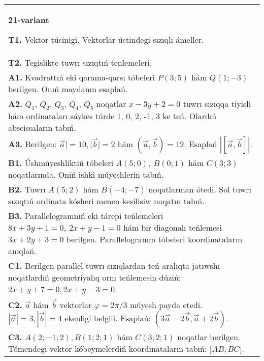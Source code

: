 \documentclass{article}
\begin{document}
\begin{tabular}{m{17cm}}
\textbf{21-variant}

\textbf{T1.} 
Vektor túsinigi. Vektorlar ústindegi sızıqlı ámeller.
 \\
\textbf{T2.} 
Tegislikte tuwrı sızıqtıń tenlemeleri.
 \\
\textbf{A1.} 
Kvadrattıń eki qarama-qarsı tóbeleri $P (3; 5) $ hám
$Q (1; -3) $ berilgen. Onıń maydanın esaplań.
 \\
\textbf{A2.} 
$Q_1$, $Q_2$, $Q_3$, $Q_4$, $Q_5$ noqatlar
$x-3y+2=0$ tuwrı sızıqqa tiyisli hám ordinataları sáykes túrde
1, 0, 2, -1, 3 ke teń. Olardıń abscissaların tabıń.
 \\
\textbf{A3.} 
Berilgen: $\overrightarrow{a}| = 10,|\overrightarrow{b}| = 2$ hám
$\left(\overrightarrow{a},\overrightarrow{b} \right) = 12$. Esaplań
$\left| \left\lbrack \overrightarrow{a},\overrightarrow{b} \right\rbrack \right|$.
 \\
\textbf{B1.} 
Úshmúyeshliktiń tóbeleri \(A (5;0),\ B (0;1) \) hám \(C (3;3) \)
noqatlarında. Oniń ishki múyeshlerin tabıń.
 \\
\textbf{B2.} 
Tuwrı \(A (5;2) \) hám \(B (-4; -7) \) noqatlarınan ótedi.
Sol tuwrı sızıqtıń ordinata kósheri menen kesilisiw noqatın tabıń.
 \\
\textbf{B3.} 
Parallelogramnıń eki tárepi teńlemeleri
\(8x+3y+1=0,\ 2x+y-1=0\) hám bir diagonalı teńlemesi
\(3x+2y+3=0\) berilgen. Parallelogramm tóbeleri koordinataların
anıqlań.
 \\
\textbf{C1.} 
Berilgen parallel tuwrı sızıqlardan teń aralıqta jatıwshı
noqatlardıń geometriyalıq ornı teńlemesin dúziń: $2x+y+7=0, 2x+y-3=0$.
 \\
\textbf{C2.} 
$\vec{a}$ hám $\vec{b}$ vektorlar $\varphi = 2\pi/3$ múyesh payda etedi. $|\vec{a}| = 3,|\vec{b}| = 4$ ekenligi belgili. Esaplań:
$\left(3\vec{a} - 2\vec{b},\vec{a} + 2\vec{b} \right) $.
 \\
\textbf{C3.} 
$A (2; -1;2), B (1;2; 1) $ hám $C (3;2;1) $ noqatlar berilgen. Tómendegi vektor kóbeymelerdiń koordinataların tabıń:
$\lbrack\overline{AB},\overline{BC}\rbrack$.
 \\

\end{tabular}
\vspace{1cm}
\end{document}
